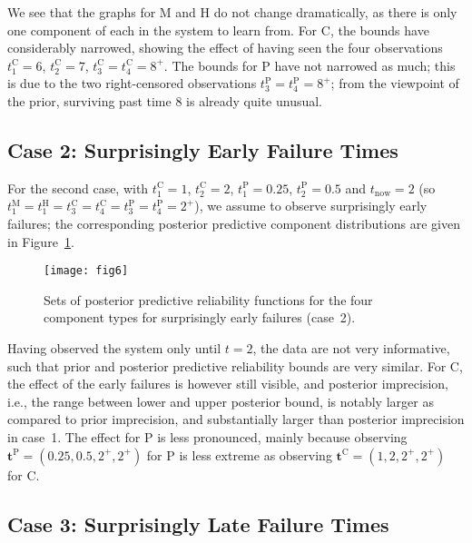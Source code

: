 \documentclass[Journal,letterpaper]{ascelike-new}
\renewcommand{\vec}[1]{{\bm#1}}
\def\tnow{t_\text{now}}
\begin{document}
We see that the graphs for M and H do not change dramatically,
as there is only one component of each in the system to learn from.
For C, the bounds have considerably narrowed,
showing the effect of having seen the four observations
$t_1^\text{C} = 6$, $t_2^\text{C} = 7$, $t_3^\text{C} = t_4^\text{C} = 8^+$.
The bounds for P have not narrowed as much;
this is due to the two right-censored observations $t_3^\text{P} = t_4^\text{P} = 8^+$;
from the viewpoint of the prior, surviving past time 8 is already quite unusual.

\subsection{Case 2: Surprisingly Early Failure Times}
\label{sec:ex-case2}

For the second case, with $t_1^\text{C} = 1$, $t_2^\text{C} = 2$, $t_1^\text{P} = 0.25$, $t_2^\text{P} = 0.5$
and $\tnow = 2$ (so $t_1^\text{M} = t_1^\text{H} = t_3^\text{C} = t_4^\text{C} = t_3^\text{P} = t_4^\text{P} = 2^+$),
we assume to observe surprisingly early failures;
the corresponding posterior predictive component distributions are given in Figure~\ref{fig:comppost-2}.
%
\begin{figure}
\texttt{[image: fig6]}
\caption{Sets of posterior predictive reliability functions for the four component types
for surprisingly early failures (case~2).}
\label{fig:comppost-2}
\end{figure}
%
Having observed the system only until $t = 2$, the data are not very informative,
such that prior and posterior predictive reliability bounds are very similar.
For C, the effect of the early failures is however still visible,
and posterior imprecision, i.e., the range between lower and upper posterior bound, is notably larger
as compared to prior imprecision, and substantially larger than posterior imprecision in case~1.
The effect for P is less pronounced,
mainly because observing $\vec{t}^\text{P} = (0.25, 0.5, 2^+, 2^+)$ for P is less extreme
as observing $\vec{t}^\text{C} = (1, 2, 2^+, 2^+)$ for C.

\subsection{Case 3: Surprisingly Late Failure Times}
\label{sec:ex-case3}
\end{document}

